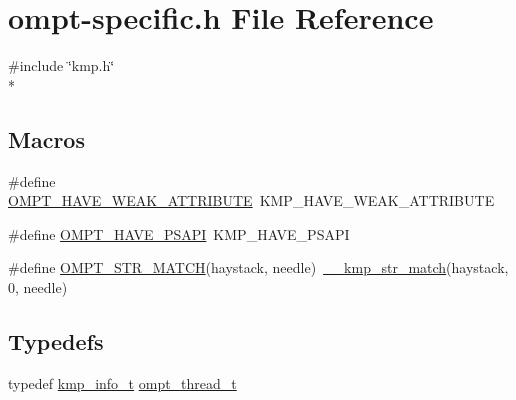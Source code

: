 \hypertarget{ompt-specific_8h}{\section{ompt-\/specific.h File Reference}
\label{ompt-specific_8h}
}
{\ttfamily \#include \char`\"{}kmp.\-h\char`\"{}}\\*
\subsection*{Macros}
\begin{DoxyCompactItemize}
\item 
\#define \hyperlink{ompt-specific_8h_a05d814d61d3310d6018db42f447891d3}{O\-M\-P\-T\-\_\-\-H\-A\-V\-E\-\_\-\-W\-E\-A\-K\-\_\-\-A\-T\-T\-R\-I\-B\-U\-T\-E}~K\-M\-P\-\_\-\-H\-A\-V\-E\-\_\-\-W\-E\-A\-K\-\_\-\-A\-T\-T\-R\-I\-B\-U\-T\-E
\item 
\#define \hyperlink{ompt-specific_8h_a4cf91dcbe0e02f798a590ca7b9558774}{O\-M\-P\-T\-\_\-\-H\-A\-V\-E\-\_\-\-P\-S\-A\-P\-I}~K\-M\-P\-\_\-\-H\-A\-V\-E\-\_\-\-P\-S\-A\-P\-I
\item 
\#define \hyperlink{ompt-specific_8h_a38712776a3564cf1f0deca5df0733a97}{O\-M\-P\-T\-\_\-\-S\-T\-R\-\_\-\-M\-A\-T\-C\-H}(haystack, needle)~\hyperlink{kmp__str_8h_a428f3947f9602b2225f18c3f3eacd811}{\-\_\-\-\_\-kmp\-\_\-str\-\_\-match}(haystack, 0, needle)
\end{DoxyCompactItemize}
\subsection*{Typedefs}
\begin{DoxyCompactItemize}
\item 
typedef \hyperlink{kmp_8h_a194859801fe16b326efe34501a37c30a}{kmp\-\_\-info\-\_\-t} \hyperlink{ompt-specific_8h_aba08ad17c82d2eea9f877a3ec41e4987}{ompt\-\_\-thread\-\_\-t}
\end{DoxyCompactItemize}
